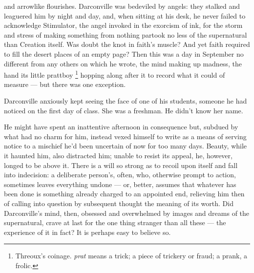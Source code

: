 and arrowlike flourishes.
Darconville was bedeviled by angels: they stalked and leaguered him by night and
day, and, when sitting at his desk, he never failed to acknowledge Stimulator,
the angel invoked in the exorcism 
of ink, for the storm and stress of making something from nothing partook 
no less of the supernatural than Creation itself.
Was doubt the knot in faith's muscle? And yet faith required to fill the desert
places of an empty page? Then this was a day in September no different from any
others on which he wrote, the mind making up madness, the hand its little
prattboy 
\footnote{Threoux's coinage. \textit{prat} means a trick; a piece of
trickery or fraud; a prank, a frolic. }
hopping along after it to record what it could of measure --- but there was
one exception.

  Darconville anxiously kept seeing the face of one of his students, someone he
had noticed on the first day of class. She was a freshman. He didn't know her
name.

  He might have spent an inattentive afternoon in consequence but, subdued by
what had no charm for him, instead vexed 
himself to write as a means of serving
notice to a mischief he'd been uncertain of now for too many days. Beauty, while
it haunted him, also distracted him; unable to resist its appeal, he, however,
longed to be above it. There is a will so strong as to recoil upon itself and
fall into indecision: a deliberate person's, often, who, otherwise prompt to
action, sometimes leaves everything undone --- or, better, assumes that 
whatever has
been done is something already charged to an appointed end, relieving him then
of calling into question by subsequent thought the meaning of its worth. Did
Darconville's mind, then, obsessed and overwhelmed by images and dreams of the
supernatural, crave at last for the one thing stranger than all these --- the
experience of it in fact? It is perhaps easy to believe so.


